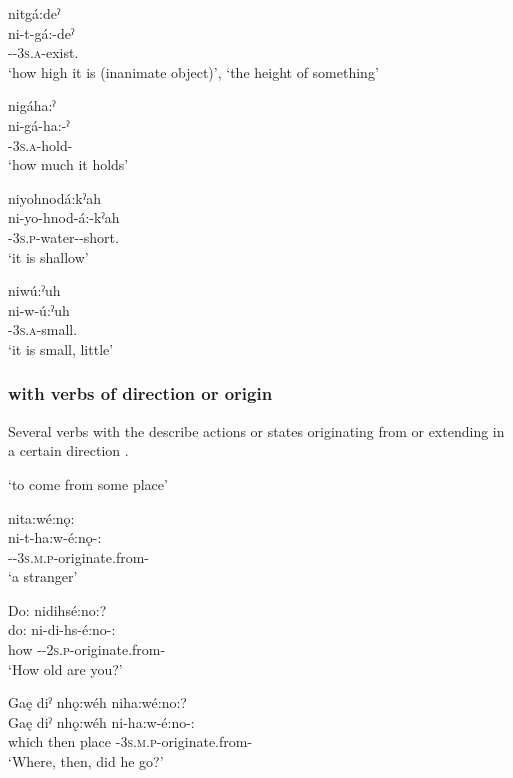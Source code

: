 \ex nitgá:deˀ \\
\gll ni-t-gá:-deˀ\\
{\partitive}-{\cislocative}-\textsc{3s.a}-exist.{\stative}\\
\glt ‘how high it is (inanimate object)’, `the height of something'

\ex nigáha:ˀ\\
\gll ni-gá-ha:-ˀ\\
{\partitive}-\textsc{3s.a}-hold-{\stative}\\
\glt `how much it holds'

\ex niyohnodá:kˀah\\
\gll ni-yo-hnod-á:-kˀah\\
{\partitive}-\textsc{3s.p}-water-{\joinerA}-short.{\stative}\\
\glt `it is shallow'

\ex niwú:ˀuh\\
\gll ni-w-ú:ˀuh\\
{\partitive}-\textsc{3s.a}-small.{\stative}\\
\glt `it is small, little'
\z
\z


\subsubsection*{ \textsc{\partitive} with verbs of direction or origin} \label{[ni-] (partitive) with verbs of direction or origin}
Several verbs with the  \textsc{\partitive} describe actions or states originating from or extending in a certain direction .

\ea\label{ex:niex}  ‘to come from some place’ 

\ea nita:wé:nǫ:\\
\gll ni-t-ha:w-é:nǫ-:\\
{\partitive}-{\cislocative}-\textsc{3s.m.p}-originate.from-{\stative}\\
\glt `a stranger'


\ex Do: nidihsé:no:?  \\
\gll do: ni-di-hs-é:no-:\\
how {\partitive}-{\cislocative}-\textsc{2s.p}-originate.from-{\stative}\\
\glt ‘How old are you?’

\ex Gaę diˀ nhǫ:wéh niha:wé:no:?  \\
\gll Gaę diˀ nhǫ:wéh ni-ha:w-é:no-:\\
which then place {\partitive}-\textsc{3s.m.p}-originate.from-{\stative}\\
\glt ‘Where, then, did he go?’

